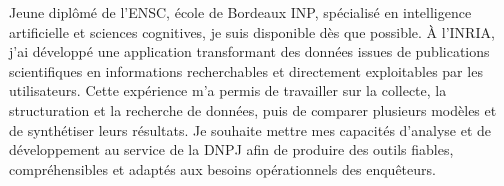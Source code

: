 
\begin{cvparagraph}
Jeune diplômé de l’ENSC, école de Bordeaux INP, spécialisé en intelligence artificielle et sciences cognitives, je suis disponible dès que possible. À l’INRIA, j’ai développé une application transformant des données issues de publications scientifiques en informations recherchables et directement exploitables par les utilisateurs. Cette expérience m’a permis de travailler sur la collecte, la structuration et la recherche de données, puis de comparer plusieurs modèles et de synthétiser leurs résultats. Je souhaite mettre mes capacités d’analyse et de développement au service de la DNPJ afin de produire des outils fiables, compréhensibles et adaptés aux besoins opérationnels des enquêteurs.
\end{cvparagraph}
